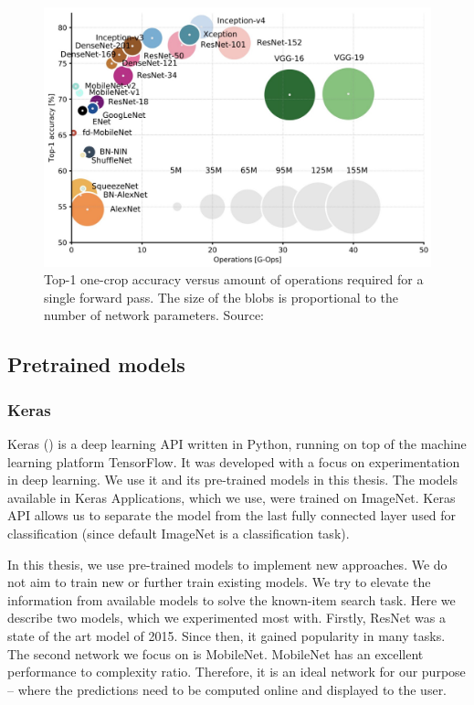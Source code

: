 \begin{figure}
    \centering
	\includegraphics[width=0.8\linewidth]{img/network-comparison.jpeg}
	\caption{Top-1 one-crop accuracy versus amount of operations required for a single forward pass. The size of the blobs is proportional to the number of network parameters. Source: \cite{canziani2016analysis}}
	\label{fig:camera-setup}
\end{figure}

\subsection{Pretrained models}
\label{ss:pretrained_models}

\subsubsection{Keras}

Keras (\cite{chollet2015keras}) is a deep learning API written in Python, running on top of the machine learning platform TensorFlow\cite{tensorflow2015-whitepaper}. It was developed with a focus on experimentation in deep learning. We use it and its pre-trained models in this thesis. The models available in Keras Applications, which we use, were trained on ImageNet. Keras API allows us to separate the model from the last fully connected layer used for classification (since default ImageNet is a classification task). 

In this thesis, we use pre-trained models to implement new approaches. We do not aim to train new or further train existing models. We try to elevate the information from available models to solve the known-item search task. Here we describe two models, which we experimented most with. Firstly, ResNet was a state of the art model of 2015. Since then, it gained popularity in many tasks. The second network we focus on is MobileNet. MobileNet has an excellent performance to complexity ratio. Therefore, it is an ideal network for our purpose -- where the predictions need to be computed online and displayed to the user.

